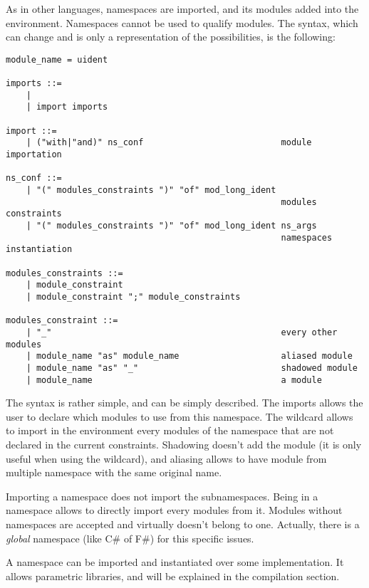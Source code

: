 \documentclass[11pt,a4paper]{article}
\begin{document}
\medskip

As in other languages, namespaces are imported, and its modules added into the
environment. Namespaces cannot be used to qualify modules. The syntax, which can
change and is only a representation of the possibilities, is the following:

\begin{verbatim}
module_name = uident

imports ::=
    | 
    | import imports 

import ::=
    | ("with|"and)" ns_conf                           module importation    

ns_conf ::=
    | "(" modules_constraints ")" "of" mod_long_ident 
                                                      modules constraints
    | "(" modules_constraints ")" "of" mod_long_ident ns_args 
                                                      namespaces instantiation 

modules_constraints ::=
    | module_constraint
    | module_constraint ";" module_constraints

modules_constraint ::=
    | "_"                                             every other modules
    | module_name "as" module_name                    aliased module
    | module_name "as" "_"                            shadowed module
    | module_name                                     a module
\end{verbatim}

The syntax is rather simple, and can be simply described. The imports allows the
user to declare which modules to use from this namespace. The wildcard allows to
import in the environment every modules of the namespace that are not declared
in the current constraints. Shadowing doesn't add the module (it is only useful
when using the wildcard), and aliasing allows to have module from multiple
namespace with the same original name.

Importing a namespace does not import the subnamespaces. Being in a namespace
allows to directly import every modules from it. Modules without namespaces are
accepted and virtually doesn't belong to one. Actually, there is a \emph{global}
namespace (like C\# of F\#) for this specific issues.

A namespace can be imported and instantiated over some implementation. It allows
parametric libraries, and will be explained in the compilation section. 
\end{document}
